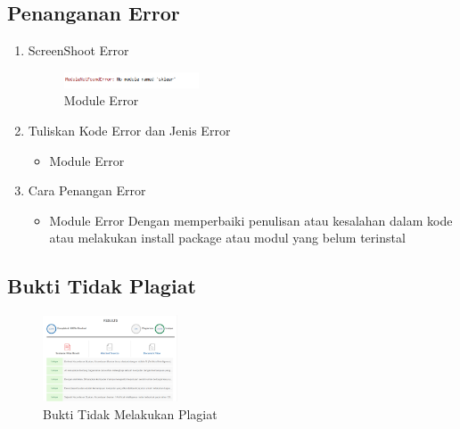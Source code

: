 \subsection{Penanganan Error}
\begin{enumerate}
	\item ScreenShoot Error
	\begin{figure}[H]
		\includegraphics[width=4cm]{figures/1174084/1/error/1.png}
		\centering
		\caption{Module Error}
	\end{figure}
	\item Tuliskan Kode Error dan Jenis Error
	\begin{itemize}
		\item Module Error
	\end{itemize}
	\item Cara Penangan Error
	\begin{itemize}
		\item Module Error
		\hfill\break
		Dengan memperbaiki penulisan atau kesalahan dalam kode atau melakukan install package atau modul yang belum terinstal 
	\end{itemize}
\end{enumerate}
\subsection{Bukti Tidak Plagiat}
\begin{figure}[H]
	\includegraphics[width=4cm]{figures/1174084/1/plagiarisme.png}
	\centering
	\caption{Bukti Tidak Melakukan Plagiat}
\end{figure}